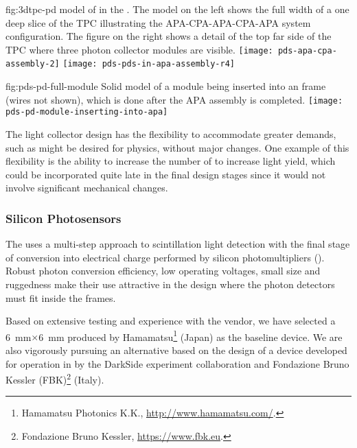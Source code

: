 \begin{dunefigure}{fig:3dtpc-pd}
{\threed model of  in the . The model on the left shows the full width of a one  deep slice of the TPC illustrating the APA-CPA-APA-CPA-APA system configuration. The figure on the right shows a detail of the top far side of the TPC where three photon collector modules are visible.}
\texttt{[image: pds-apa-cpa-assembly-2]}
\texttt{[image: pds-pds-in-apa-assembly-r4]}
\end{dunefigure}

\begin{dunefigure}{fig:pds-pd-full-module}
{Solid model of a  module being inserted into an  frame (wires not shown), which is done after the APA assembly is completed.}
\texttt{[image: pds-pd-module-inserting-into-apa]}
\end{dunefigure}

The  light collector design has the flexibility to accommodate greater demands, such as might be desired for  physics, without major changes. One example of this flexibility is the ability to increase the number of  to increase light yield, which could be incorporated quite late in the final design stages since it would not involve significant mechanical changes.

\subsubsection{Silicon Photosensors} 
\label{sssec:photosensors}

The   uses a multi-step approach to scintillation light detection with the final stage of conversion into electrical charge performed by silicon photomultipliers (). Robust photon conversion efficiency, low operating voltages, small size and ruggedness make their use attractive in the \single design where the photon detectors must fit inside the  frames. 

Based on extensive testing and experience with the vendor, we have selected a \SI{6}{mm}$\times$\SI{6}{mm}  %
produced by Hamamatsu\footnote{Hamamatsu\texttrademark{} Photonics K.K., \url{http://www.hamamatsu.com/}.} (Japan) as the baseline  device. 
We are also vigorously pursuing an alternative based on the design of a device developed for operation in \lar by the DarkSide experiment collaboration and Fondazione Bruno Kessler (FBK)\footnote{Fondazione Bruno Kessler\texttrademark{}, \url{https://www.fbk.eu}.} (Italy).


